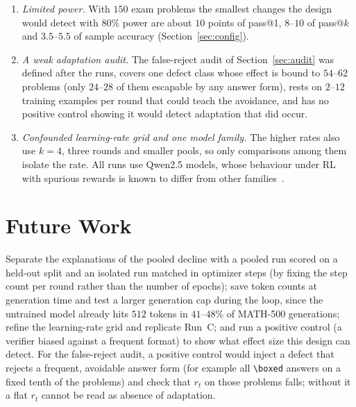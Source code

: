 \documentclass[runningheads]{llncs}
\begin{document}
\begin{enumerate}
was varied. No arm in any design improves detectably on its round~0, including training on
reference solutions, so we have no positive reference showing that this recipe
can help a 1.5B model at all; the declines may partly reflect the recipe rather
than self-training.
\item \emph{Limited power.} With $150$ exam problems the smallest changes the
design would detect with $80\%$ power are about $10$ points of pass@1, $8$--$10$
of pass@$k$ and $3.5$--$5.5$ of sample accuracy (Section~\ref{sec:config}).
\item \emph{A weak adaptation audit.} The false-reject audit of
Section~\ref{sec:audit} was defined after the runs, covers one defect class
whose effect is bound to $54$--$62$ problems (only $24$--$28$ of them escapable
by any answer form), rests on $2$--$12$ training examples per round that could
teach the avoidance, and has no positive control showing it would detect
adaptation that did occur.
\item \emph{Confounded learning-rate grid and one model family.} The higher
rates also use $k=4$, three rounds and smaller pools, so only comparisons among
them isolate the rate. All runs use Qwen2.5 models, whose behaviour under RL
with spurious rewards is known to differ from other families~\cite{ref_spurious}.
\end{enumerate}

\section{Future Work}
\label{app:future}

Separate the explanations of the pooled decline with a pooled run scored on a
held-out split and an isolated run matched in optimizer steps (by fixing the
step count per round rather than the number of epochs); save token
counts at generation time and test a larger generation cap during the loop, since
the untrained model already hits $512$ tokens in $41$--$48\%$ of MATH-500 generations;
refine the learning-rate grid and replicate Run~C;
and run a positive control (a verifier biased against a frequent format) to show
what effect size this design can detect. For the false-reject audit, a
positive control would inject a defect that rejects a frequent, avoidable
answer form (for example all \verb|\boxed| answers on a fixed tenth of the
problems) and check that $r_t$ on those problems falls; without it a flat
$r_t$ cannot be read as absence of adaptation.
\end{document}
